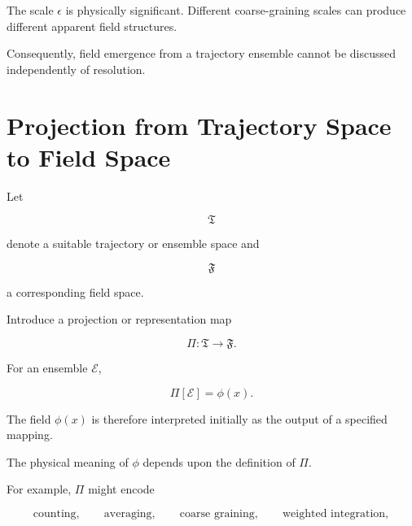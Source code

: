\documentclass[12pt,oneside]{book}
\begin{document}
The scale \(\epsilon\) is physically significant. Different
coarse-graining scales can produce different apparent field
structures.

Consequently, field emergence from a trajectory ensemble cannot
be discussed independently of resolution.


\section{Projection from Trajectory Space to Field Space}
\label{sec:trajectory-field-projection}

Let

\begin{equation}
    \mathfrak{T}
\end{equation}

denote a suitable trajectory or ensemble space and

\begin{equation}
    \mathfrak{F}
\end{equation}

a corresponding field space.

Introduce a projection or representation map

\begin{equation}
    \Pi:
    \mathfrak{T}
    \rightarrow
    \mathfrak{F}.
    \label{eq:trajectory-field-projection}
\end{equation}

For an ensemble \(\mathscr{E}\),

\begin{equation}
    \Pi[\mathscr{E}]
    =
    \phi(x).
    \label{eq:ensemble-field-map}
\end{equation}

The field \(\phi(x)\) is therefore interpreted initially as the
output of a specified mapping.

The physical meaning of \(\phi\) depends upon the definition of
\(\Pi\).

For example, \(\Pi\) might encode

\begin{equation}
    \text{counting},
    \qquad
    \text{averaging},
    \qquad
    \text{coarse graining},
    \qquad
    \text{weighted integration},
\end{equation}
\end{document}
